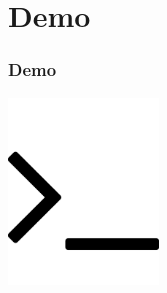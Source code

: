 \documentclass{beamer}
\begin{document}
  \section{Demo}
  \begin{frame}
    \frametitle{Demo}
    \begin{center}
      \includegraphics[width=4cm]{images/demo}
    \end{center}
  \end{frame}
\end{document}
